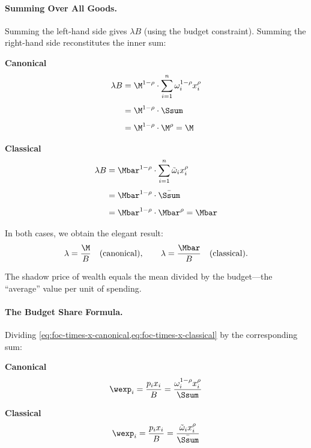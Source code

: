 \paragraph{Summing Over All Goods.}
Summing the left-hand side gives $\lambda B$ (using the budget constraint). Summing the right-hand side reconstitutes the inner sum:

\medskip
\noindent
\begin{minipage}[t]{0.48\textwidth}
\centering\textbf{Canonical}
\begin{align}
\lambda B &= \M^{1-\rho} \cdot \sum_{i=1}^n \omega_i^{1-\rho} x_i^{\rho} \notag \\[4pt]
&= \M^{1-\rho} \cdot \Ssum \notag \\[4pt]
&= \M^{1-\rho} \cdot \M^{\rho} = \M
\label{eq:sum-canonical}
\end{align}
\end{minipage}%
\hfill
\begin{minipage}[t]{0.48\textwidth}
\centering\textbf{Classical}
\begin{align}
\lambda B &= \Mbar^{1-\rho} \cdot \sum_{i=1}^n \tilde{\omega}_i x_i^{\rho} \notag \\[4pt]
&= \Mbar^{1-\rho} \cdot \bar{\Ssum} \notag \\[4pt]
&= \Mbar^{1-\rho} \cdot \Mbar^{\rho} = \Mbar
\label{eq:sum-classical}
\end{align}
\end{minipage}

\medskip
\noindent
In both cases, we obtain the elegant result:
\begin{equation}
\lambda = \frac{\M}{B} \quad \text{(canonical)}, \qquad \lambda = \frac{\Mbar}{B} \quad \text{(classical)}.
\label{eq:lambda-value}
\end{equation}

The shadow price of wealth equals the mean divided by the budget---the ``average'' value per unit of spending.

\paragraph{The Budget Share Formula.}
Dividing \cref{eq:foc-times-x-canonical,eq:foc-times-x-classical} by the corresponding sum:

\medskip
\noindent
\begin{minipage}[t]{0.48\textwidth}
\centering\textbf{Canonical}
\begin{equation}
\wexp_i = \frac{p_i x_i}{B} = \frac{\omega_i^{1-\rho} x_i^{\rho}}{\Ssum}
\label{eq:share-canonical}
\end{equation}
\end{minipage}%
\hfill
\begin{minipage}[t]{0.48\textwidth}
\centering\textbf{Classical}
\begin{equation}
\wexp_i = \frac{p_i x_i}{B} = \frac{\tilde{\omega}_i x_i^{\rho}}{\bar{\Ssum}}
\label{eq:share-classical}
\end{equation}
\end{minipage}

